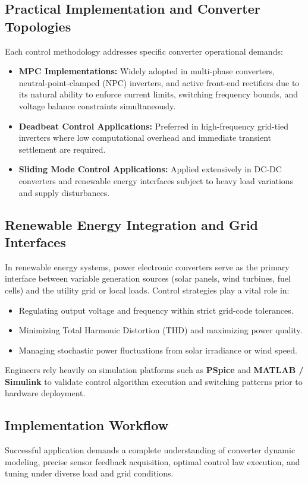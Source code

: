 \documentclass[12pt,a4paper]{article}
\begin{document}
\subsection{Practical Implementation and Converter Topologies}
Each control methodology addresses specific converter operational demands:
\begin{itemize}
    \item \textbf{MPC Implementations:} Widely adopted in multi-phase converters, neutral-point-clamped (NPC) inverters, and active front-end rectifiers due to its natural ability to enforce current limits, switching frequency bounds, and voltage balance constraints simultaneously.
    \item \textbf{Deadbeat Control Applications:} Preferred in high-frequency grid-tied inverters where low computational overhead and immediate transient settlement are required.
    \item \textbf{Sliding Mode Control Applications:} Applied extensively in DC-DC converters and renewable energy interfaces subject to heavy load variations and supply disturbances.
\end{itemize}

\subsection{Renewable Energy Integration and Grid Interfaces}
In renewable energy systems, power electronic converters serve as the primary interface between variable generation sources (solar panels, wind turbines, fuel cells) and the utility grid or local loads. Control strategies play a vital role in:
\begin{itemize}
    \item Regulating output voltage and frequency within strict grid-code tolerances.
    \item Minimizing Total Harmonic Distortion (THD) and maximizing power quality.
    \item Managing stochastic power fluctuations from solar irradiance or wind speed.
\end{itemize}

Engineers rely heavily on simulation platforms such as \textbf{PSpice} and \textbf{MATLAB / Simulink} to validate control algorithm execution and switching patterns prior to hardware deployment.

\subsection{Implementation Workflow}
Successful application demands a complete understanding of converter dynamic modeling, precise sensor feedback acquisition, optimal control law execution, and tuning under diverse load and grid conditions.
\end{document}
